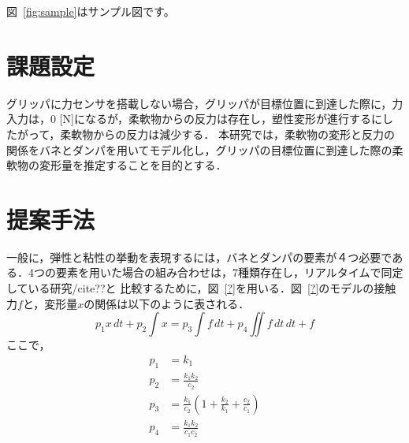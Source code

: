 \documentclass[a4paper]{jarticle}
\begin{document}
図~\ref{fig:sample}はサンプル図です。
\section{課題設定}
グリッパに力センサを搭載しない場合，グリッパが目標位置に到達した際に，力入力は，0 [N]になるが，柔軟物からの反力は存在し，塑性変形が進行するにしたがって，柔軟物からの反力は減少する．
本研究では，柔軟物の変形と反力の関係をバネとダンパを用いてモデル化し，グリッパの目標位置に到達した際の柔軟物の変形量を推定することを目的とする．
\section{提案手法}
一般に，弾性と粘性の挙動を表現するには，バネとダンパの要素が４つ必要である\cite{?}．4つの要素を用いた場合の組み合わせは，7種類存在し，リアルタイムで同定している研究/cite{??}と
比較するために，図~\ref{?}を用いる．図~\ref{?}のモデルの接触力$f$と，変形量$x$の関係は以下のように表される．
\begin{equation}
p_1 {x}\,dt + p_2 \int{x} = p_3\int{f}\,dt +p_4\iint{f}\,dt\,dt  + f
\label{eq:BSmodel}
\end{equation}
ここで，
\begin{equation}
    \begin{aligned}
        p_1 &= k_1  \\
        p_2 &= \frac{k_1 k_2}{c_2}      \\
        p_3 &= \frac{k_1}{c_2}(1+\frac{k_2}{k_1}+\frac{c_2}{c_1}) \\
        p_4 &= \frac{k_1k_2}{c_1 c_2} \\
    \end{aligned}
\end{equation}
\end{document}
